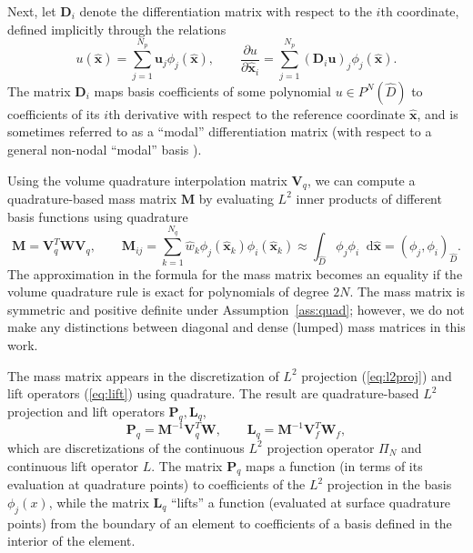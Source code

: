 \documentclass[preprint,10pt]{article}
\theoremstyle{definition}
\theoremstyle{lemma}
\theoremstyle{theorem}
\theoremstyle{assumption}
\renewcommand{\hat}{\widehat}
\newcommand{\pd}[2]{\frac{\partial#1}{\partial#2}}
\newcommand{\LRp}[1]{\left( #1 \right)}
\newcommand{\note}[1]{{\color{blue}{#1}}}
\newcommand{\lcwnote}[1]{{\color{magenta}{#1}}}
\newcommand*\diff[1]{\mathop{}\!{\mathrm{d}#1}} %
\begin{document}
{Next, let ${\bm{D}}_i$ denote the differentiation matrix with respect to the $i$th coordinate, defined implicitly through the relations
\[
u(\hat{\bm{x}}) = \sum_{j=1}^{N_p} \bm{u}_j \phi_j(\hat{\bm{x}}), \qquad \pd{u}{\hat{\bm{x}}_i} = \sum_{j=1}^{N_p} \LRp{{\bm{D}}_i \bm{u}}_j\phi_j(\hat{\bm{x}}).
\]
The matrix ${\bm{D}}_i$ maps basis coefficients of some polynomial $u \in P^N\LRp{\hat{D}}$ to coefficients of its $i$th derivative with respect to the reference coordinate $\hat{\bm{x}}$, and is sometimes referred to as a ``modal'' differentiation matrix (with respect to a general non-nodal ``modal'' basis \cite{hicken2016multidimensional}).  

Using the volume quadrature interpolation matrix $\bm{V}_q$, we can compute a quadrature-based mass matrix $\bm{M}$ by evaluating $L^2$ inner products of different basis functions using quadrature
\[
  \bm{M} = \bm{V}_q^T\bm{W}\bm{V}_q, \qquad \bm{M}_{ij} = \sum_{k=1}^{N_q} \hat{w}_k \phi_j(\hat{\bm{x}}_k)\phi_i(\hat{\bm{x}}_k) \approx \int_{\hat{D}}\phi_j\phi_i \diff{\hat{\bm{x}}} = \LRp{\phi_j,\phi_i}_{\hat{D}}.
\]
The approximation in the formula for the mass matrix becomes an equality if the volume quadrature rule is exact for polynomials of degree $2N$.  The mass matrix is symmetric and positive definite under Assumption~\ref{ass:quad}; however, we do not make any distinctions between diagonal and dense (lumped) mass matrices in this work.  


The mass matrix appears in the discretization of $L^2$ projection (\ref{eq:l2proj}) and lift operators (\ref{eq:lift}) using quadrature.  The result are quadrature-based $L^2$ projection and lift operators $\bm{P}_q, \bm{L}_q$, 
\begin{equation}
\bm{P}_q = \bm{M}^{-1}\bm{V}_q^T\bm{W}, \qquad \bm{L}_q = \bm{M}^{-1}\bm{V}_f^T \bm{W}_f,
\label{eq:projlift}
\end{equation}
which are discretizations of the continuous $L^2$ projection operator $\Pi_N$ and continuous lift operator $L$.  The matrix $\bm{P}_q$ maps a function (in terms of its evaluation at quadrature points) to coefficients of the $L^2$ projection in the basis $\phi_j(x)$, while the matrix $\bm{L}_q$ ``lifts'' a function (evaluated at surface quadrature points) from the boundary of an element to coefficients of a basis defined in the interior of the element.  

}
\end{document}
